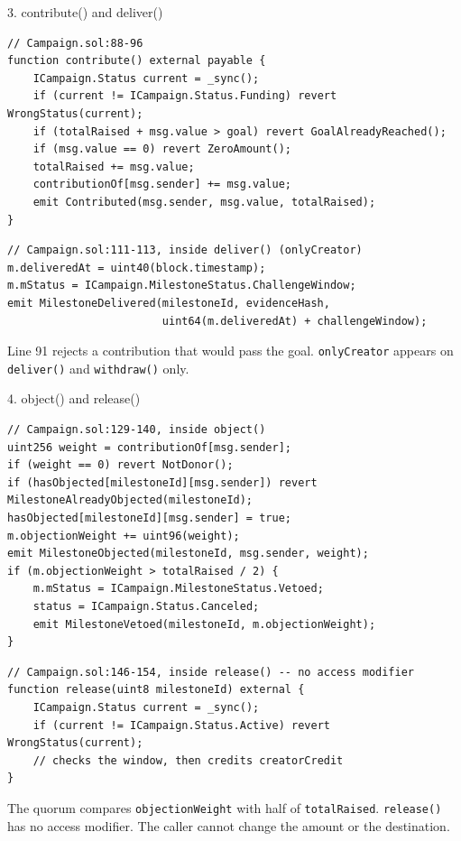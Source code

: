 \documentclass[aspectratio=169,10pt]{beamer}
\begin{document}
\begin{frame}[fragile]{3. contribute() and deliver()}
\footnotesize
\begin{verbatim}
// Campaign.sol:88-96
function contribute() external payable {
    ICampaign.Status current = _sync();
    if (current != ICampaign.Status.Funding) revert WrongStatus(current);
    if (totalRaised + msg.value > goal) revert GoalAlreadyReached();
    if (msg.value == 0) revert ZeroAmount();
    totalRaised += msg.value;
    contributionOf[msg.sender] += msg.value;
    emit Contributed(msg.sender, msg.value, totalRaised);
}
\end{verbatim}
\vspace{0.25em}
\begin{verbatim}
// Campaign.sol:111-113, inside deliver() (onlyCreator)
m.deliveredAt = uint40(block.timestamp);
m.mStatus = ICampaign.MilestoneStatus.ChallengeWindow;
emit MilestoneDelivered(milestoneId, evidenceHash,
                        uint64(m.deliveredAt) + challengeWindow);
\end{verbatim}
\vspace{0.25em}
\small Line 91 rejects a contribution that would pass the goal. \texttt{onlyCreator} appears on
\texttt{deliver()} and \texttt{withdraw()} only.
\end{frame}

\begin{frame}[fragile]{4. object() and release()}
\scriptsize
\begin{verbatim}
// Campaign.sol:129-140, inside object()
uint256 weight = contributionOf[msg.sender];
if (weight == 0) revert NotDonor();
if (hasObjected[milestoneId][msg.sender]) revert MilestoneAlreadyObjected(milestoneId);
hasObjected[milestoneId][msg.sender] = true;
m.objectionWeight += uint96(weight);
emit MilestoneObjected(milestoneId, msg.sender, weight);
if (m.objectionWeight > totalRaised / 2) {
    m.mStatus = ICampaign.MilestoneStatus.Vetoed;
    status = ICampaign.Status.Canceled;
    emit MilestoneVetoed(milestoneId, m.objectionWeight);
}
\end{verbatim}
\vspace{0.25em}
\begin{verbatim}
// Campaign.sol:146-154, inside release() -- no access modifier
function release(uint8 milestoneId) external {
    ICampaign.Status current = _sync();
    if (current != ICampaign.Status.Active) revert WrongStatus(current);
    // checks the window, then credits creatorCredit
}
\end{verbatim}
\vspace{0.3em}
\small The quorum compares \texttt{objectionWeight} with half of \texttt{totalRaised}. \texttt{release()} has no access modifier.
The caller cannot change the amount or the destination.
\end{frame}
\end{document}
